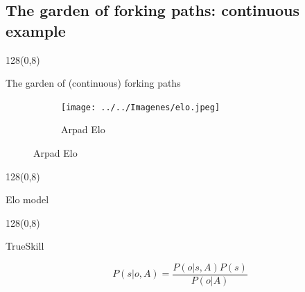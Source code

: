 \documentclass[shownotes]{beamer}
\begin{document}
\subsection{The garden of forking paths: continuous example}

\begin{frame}
 \begin{textblock}{128}(0,8)
\begin{center}
 \large The garden of (continuous) forking paths 
\end{center}
\end{textblock}
\vspace{1.25cm}




  \begin{figure}[H]     
     \centering \normalsize
     \begin{subfigure}[b]{0.4\textwidth}
       \texttt{[image: ../../Imagenes/elo.jpeg]} 
       \caption*{Arpad Elo}
     \end{subfigure}
\end{figure}

\end{frame}

\begin{frame}
 \begin{textblock}{128}(0,8)
\begin{center}
 \normalsize Elo model
\end{center}
\end{textblock}


\end{frame}

\begin{frame}
 \begin{textblock}{128}(0,8)
\begin{center}
 \normalsize TrueSkill
\end{center}
\end{textblock}
\vspace{0.5cm}

 
 
\begin{equation*}
 P(s|o,A) = \frac{P(o|s,A)P(s)}{P(o|A)}
\end{equation*}

 
\end{frame}
\end{document}
